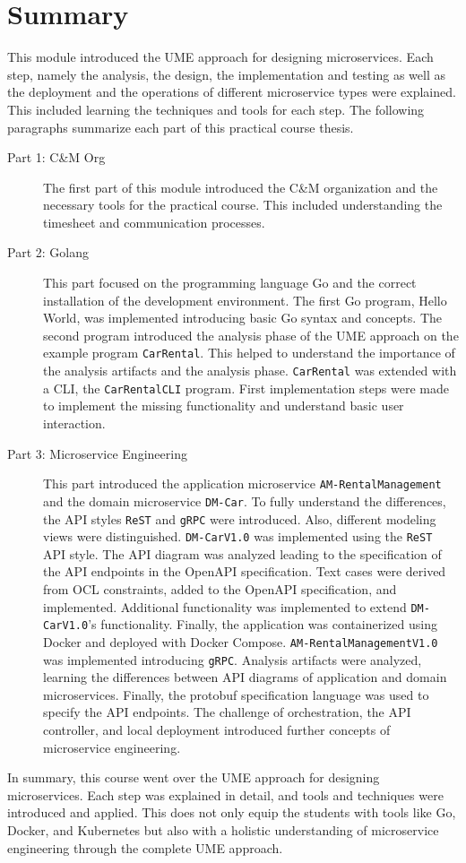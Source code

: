 \chapter{Summary}
\label{cha:summary_outlook}
This module introduced the UME approach for designing microservices.
Each step, namely the analysis, the design, the implementation and testing as well as the deployment and the operations of different microservice types were explained.
This included learning the techniques and tools for each step.
The following paragraphs summarize each part of this practical course thesis.

\begin{description}
    \item[Part 1: C\&M Org] The first part of this module introduced the C\&M organization and the necessary tools for the practical course.
    This included understanding the timesheet and communication processes.
    \item[Part 2: Golang] This part focused on the programming language Go and the correct installation of the development environment.
    The first Go program, Hello World, was implemented introducing basic Go syntax and concepts.
    The second program introduced the analysis phase of the UME approach on the example program \texttt{CarRental}.
    This helped to understand the importance of the analysis artifacts and the analysis phase.
    \texttt{CarRental} was extended with a CLI, the \texttt{CarRentalCLI} program.
    First implementation steps were made to implement the missing functionality and understand basic user interaction.
    \item[Part 3: Microservice Engineering] This part introduced the application microservice \texttt{AM-RentalManagement} and the domain microservice \texttt{DM-Car}.
    To fully understand the differences, the API styles \texttt{ReST} and \texttt{gRPC} were introduced.
    Also, different modeling views were distinguished.
    \texttt{DM-CarV1.0} was implemented using the \texttt{ReST} API style.
    The API diagram was analyzed leading to the specification of the API endpoints in the OpenAPI specification.
    Text cases were derived from OCL constraints, added to the OpenAPI specification, and implemented.
    Additional functionality was implemented to extend \texttt{DM-CarV1.0}'s functionality.
    Finally, the application was containerized using Docker and deployed with Docker Compose.
    \texttt{AM-RentalManagementV1.0} was implemented introducing \texttt{gRPC}.
    Analysis artifacts were analyzed, learning the differences between API diagrams of application and domain microservices.
    Finally, the protobuf specification language was used to specify the API endpoints.
    The challenge of orchestration, the API controller, and local deployment introduced further concepts of microservice engineering.
\end{description}

In summary, this course went over the UME approach for designing microservices.
Each step was explained in detail, and tools and techniques were introduced and applied.
This does not only equip the students with tools like Go, Docker, and Kubernetes but also with a holistic understanding of microservice engineering through the complete UME approach.